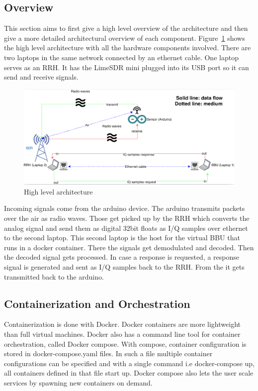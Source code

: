\subsection{Overview}
This section aims to first give a high level overview of the architecture and then give a more detailed 
architectural overview of each component.
Figure~\ref{fig:high_level_arch} shows the high level architecture with all the hardware components involved.
There are two laptops in the same network connected by an ethernet cable. One laptop serves as an RRH. It has the LimeSDR mini 
plugged into its USB port so it can send and receive signals.
\begin{figure}[h]
    \centering
    \includegraphics[width=1\textwidth]{figures/high_level_arch.png}
    \caption{High level architecture}
    \label{fig:high_level_arch}
\end{figure}
Incoming signals come from the arduino device. The arduino transmits packets over the air as radio waves. Those get picked up 
by the RRH which converts the analog signal and send them as digital 32bit floats as I/Q samples over ethernet to the second laptop.
This second laptop is the host for the virtual BBU that runs in a docker container. There the signals get demodulated and decoded.
Then the decoded signal gets processed. In case a response is requested, a response signal is generated and sent as I/Q samples back to the RRH.
From the it gets transmitted back to the arduino.
\subsection{Containerization and Orchestration}
Containerization is done with Docker. Docker containers are more lightweight than full virtual machines.
Docker also has a command line tool for container orchestration, called Docker compose. With compose, container configuration is stored in docker-compose.yaml files.
In such a file multiple container configurations can be specified and with a single command i.e docker-compose up, all containers defined in that file start up.
Docker compose also lets the user scale services by spawning new containers on demand.
